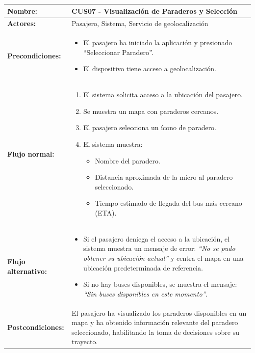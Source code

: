 \documentclass[12pt]{article}
\begin{document}
    \clearpage
    \begin{table}[!h]
    \centering
    \begin{tabular}{|p{3.5cm}|p{11cm}|}
    \hline
    \textbf{Nombre:} & CUS07 - Visualización de Paraderos y Selección \\
    \hline
    \textbf{Actores:} & Pasajero, Sistema, Servicio de geolocalización \\
    \hline
    \textbf{Precondiciones:} &
    \begin{itemize}
        \item El pasajero ha iniciado la aplicación y presionado “Seleccionar Paradero”.
        \item El dispositivo tiene acceso a geolocalización.
    \end{itemize}
    \\
    \hline
    \textbf{Flujo normal:} &
    \begin{enumerate}
        \item El sistema solicita acceso a la ubicación del pasajero.
        \item Se muestra un mapa con paraderos cercanos.
        \item El pasajero selecciona un ícono de paradero.
        \item El sistema muestra:
        \begin{itemize}
            \item Nombre del paradero.
            \item Distancia aproximada de la micro al paradero seleccionado.
            \item Tiempo estimado de llegada del bus más cercano (ETA).
        \end{itemize}
    \end{enumerate}
    \\
    \hline
    \textbf{Flujo alternativo:} &
    \begin{itemize}
        \item[1a.] Si el pasajero deniega el acceso a la ubicación, el sistema muestra un mensaje de error: \textit{“No se pudo obtener su ubicación actual”} y centra el mapa en una ubicación predeterminada de referencia.
        \item[3a.] Si no hay buses disponibles, se muestra el mensaje: \textit{“Sin buses disponibles en este momento”}.
    \end{itemize}
    \\
    \hline
    \textbf{Postcondiciones:} &
    El pasajero ha visualizado los paraderos disponibles en un mapa y ha obtenido información relevante del paradero seleccionado, habilitando la toma de decisiones sobre su trayecto.
    \\
    \hline
    \end{tabular}
    \end{table}
\end{document}
